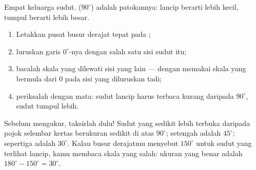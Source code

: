 \begin{omfigure}

{\small Empat keluarga sudut.  ($90^\circ$) adalah
patokannya: lancip berarti lebih kecil, tumpul berarti lebih besar.}
\end{omfigure}

\begin{method}\label{met:g6:lines:protractor}
\begin{enumerate}
  \item Letakkan pusat busur derajat tepat pada ;
  \item luruskan garis $0^\circ$-nya dengan salah satu sisi sudut itu;
  \item bacalah skala yang dilewati sisi yang lain --- dengan memakai
        skala yang bermula dari $0$ pada sisi yang diluruskan tadi;
  \item periksalah dengan mata: sudut lancip harus terbaca kurang
        daripada $90^\circ$, sudut tumpul lebih.
\end{enumerate}
\end{method}

\begin{example}\label{ex:g6:lines:estimate}
Sebelum mengukur, taksirlah dulu! Sudut yang sedikit lebih terbuka
daripada pojok selembar kertas berukuran sedikit di atas $90^\circ$;
setengah  adalah $45^\circ$; sepertiga 
adalah $30^\circ$. Kalau busur derajatmu menyebut $150^\circ$ untuk
sudut yang terlihat lancip, kamu membaca skala yang salah: ukuran yang
benar adalah $180^\circ - 150^\circ = 30^\circ$.
\end{example}

